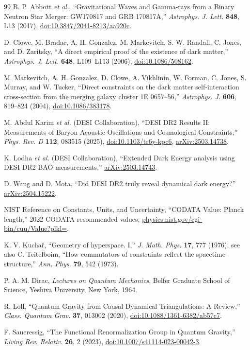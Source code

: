 \documentclass[aps,prd,reprint,nofootinbib,superscriptaddress]{revtex4-2}
\numberwithin{equation}{section}
\theoremstyle{definition}
\theoremstyle{plain}
\begin{document}
\begin{thebibliography}{99}
B. P. Abbott \emph{et al.},
``Gravitational Waves and Gamma-rays from a Binary Neutron Star Merger: GW170817 and GRB 170817A,''
\emph{Astrophys. J. Lett.} \textbf{848}, L13 (2017),
\href{https://doi.org/10.3847/2041-8213/aa920c}{doi:10.3847/2041-8213/aa920c}.

D. Clowe, M. Bradac, A. H. Gonzalez, M. Markevitch, S. W. Randall, C. Jones, and D. Zaritsky,
``A direct empirical proof of the existence of dark matter,''
\emph{Astrophys. J. Lett.} \textbf{648}, L109--L113 (2006),
\href{https://doi.org/10.1086/508162}{doi:10.1086/508162}.

M. Markevitch, A. H. Gonzalez, D. Clowe, A. Vikhlinin, W. Forman, C. Jones, S. Murray, and W. Tucker,
``Direct constraints on the dark matter self-interaction cross-section from the merging galaxy cluster 1E 0657--56,''
\emph{Astrophys. J.} \textbf{606}, 819--824 (2004),
\href{https://doi.org/10.1086/383178}{doi:10.1086/383178}.


M. Abdul Karim \emph{et al.} (DESI Collaboration),
``DESI DR2 Results II: Measurements of Baryon Acoustic Oscillations and Cosmological Constraints,''
\emph{Phys. Rev. D} \textbf{112}, 083515 (2025),
\href{https://doi.org/10.1103/tr6y-kpc6}{doi:10.1103/tr6y-kpc6},
\href{https://arxiv.org/abs/2503.14738}{arXiv:2503.14738}.

K. Lodha \emph{et al.} (DESI Collaboration),
``Extended Dark Energy analysis using DESI DR2 BAO measurements,''
\href{https://arxiv.org/abs/2503.14743}{arXiv:2503.14743}.

D. Wang and D. Mota,
``Did DESI DR2 truly reveal dynamical dark energy?''
\href{https://arxiv.org/abs/2504.15222}{arXiv:2504.15222}.

NIST Reference on Constants, Units, and Uncertainty,
``CODATA Value: Planck length,''
2022 CODATA recommended values,
\href{https://physics.nist.gov/cgi-bin/cuu/Value?plkl=}{physics.nist.gov/cgi-bin/cuu/Value?plkl=}.



K. V. Kucha\v{r}, ``Geometry of hyperspace. I,''
\emph{J. Math. Phys.} \textbf{17}, 777 (1976);
see also C. Teitelboim, ``How commutators of constraints reflect the spacetime structure,''
\emph{Ann. Phys.} \textbf{79}, 542 (1973).

P. A. M. Dirac, \emph{Lectures on Quantum Mechanics}, Belfer Graduate School of Science, Yeshiva University, New York, 1964.

R. Loll, ``Quantum Gravity from Causal Dynamical Triangulations: A Review,''
\emph{Class. Quantum Grav.} \textbf{37}, 013002 (2020),
\href{https://doi.org/10.1088/1361-6382/ab57c7}{doi:10.1088/1361-6382/ab57c7}.

F. Saueressig, ``The Functional Renormalization Group in Quantum Gravity,''
\emph{Living Rev. Relativ.} \textbf{26}, 2 (2023),
\href{https://doi.org/10.1007/s41114-023-00042-3}{doi:10.1007/s41114-023-00042-3}.

\end{thebibliography}
\end{document}
